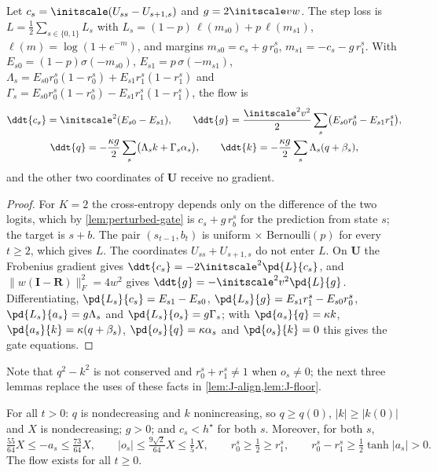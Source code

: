 \begin{lemma}[Reduced flow for $K=2$]
\label{lem:perturbed-reduce}
Let $c_s=\initscale(U_{ss}-U_{s+1,s})$ and $g=2\initscale vw$. The step loss is
$L=\frac12\sum_{s\in\{0,1\}}L_s$ with $L_s=(1-p)\,\ell(m_{s0})+p\,\ell(m_{s1})$, $\ell(m)=\log(1+e^{-m})$, and margins
$m_{s0}=c_s+g\,r^s_0$, $m_{s1}=-c_s-g\,r^s_1$. With $E_{s0}=(1-p)\sigma(-m_{s0})$, $E_{s1}=p\,\sigma(-m_{s1})$,
$\Lambda_s=E_{s0}r^s_0(1-r^s_0)+E_{s1}r^s_1(1-r^s_1)$ and $\Gamma_s=E_{s0}r^s_0(1-r^s_0)-E_{s1}r^s_1(1-r^s_1)$, the flow is
\begin{gather*}
 \ddt{c_s}=\initscale^2(E_{s0}-E_{s1}),\qquad \ddt{g}=\frac{\initscale^2v^2}{2}\sum_s\bigl(E_{s0}r^s_0-E_{s1}r^s_1\bigr),\\
 \ddt{q}=-\frac{\kappa g}{2}\sum_s\bigl(\Lambda_sk+\Gamma_s\alpha_s\bigr),\qquad \ddt{k}=-\frac{\kappa g}{2}\sum_s\Lambda_s(q+\beta_s),
\end{gather*}
and the other two coordinates of $\mathbf U$ receive no gradient.
\end{lemma}

\begin{proof}
For $K=2$ the cross-entropy depends only on the difference of the two logits, which by \cref{lem:perturbed-gate} is $c_s+g\,r^s_b$ for the
prediction from state $s$; the target is $s+b$. The pair $(s_{t-1},b_t)$ is uniform $\times$ Bernoulli$(p)$ for every $t\ge2$, which gives $L$.
The coordinates $U_{ss}+U_{s+1,s}$ do not enter $L$. On $\mathbf U$ the Frobenius gradient gives $\ddt{c_s}=-2\initscale^2\pd{L}{c_s}$, and
$\|w(\mathbf I-\mathbf R)\|_F^2=4w^2$ gives $\ddt{g}=-\initscale^2v^2\pd{L}{g}$. Differentiating, $\pd{L_s}{c_s}=E_{s1}-E_{s0}$,
$\pd{L_s}{g}=E_{s1}r^s_1-E_{s0}r^s_0$, $\pd{L_s}{a_s}=g\Lambda_s$ and $\pd{L_s}{o_s}=g\Gamma_s$; with $\pd{a_s}{q}=\kappa k$, $\pd{a_s}{k}=\kappa(q+\beta_s)$,
$\pd{o_s}{q}=\kappa\alpha_s$ and $\pd{o_s}{k}=0$ this gives the gate equations.
\end{proof}

Note that $q^2-k^2$ is not conserved and $r^s_0+r^s_1\ne1$ when $o_s\ne0$; the next three lemmas replace the uses of these facts in
\cref{lem:J-align,lem:J-floor}.

\begin{lemma}
\label{lem:perturbed-invariant}
For all $t>0$: $q$ is nondecreasing and $k$ nonincreasing, so $q\ge q(0)$, $|k|\ge|k(0)|$ and $X$ is nondecreasing; $g>0$; and $c_s<h^\star$
for both $s$. Moreover, for both $s$,
\begin{equation}
 \tfrac{55}{64}X\le-a_s\le\tfrac{73}{64}X,\qquad |o_s|\le\tfrac{9\sqrt2}{64}X\le\tfrac15X,\qquad r^s_0\ge\tfrac12\ge r^s_1,\qquad
 r^s_0-r^s_1\ge\tfrac12\tanh|a_s|>0 .
 \label{eq:perturbed-gate-bounds}
\end{equation}
The flow exists for all $t\ge0$.
\end{lemma}

